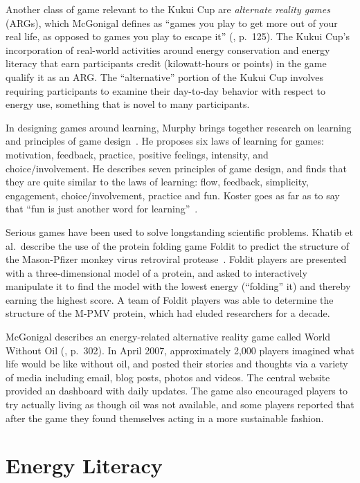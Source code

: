 Another class of game relevant to the Kukui Cup are \emph{alternate reality games} (ARGs), which McGonigal defines as ``games you play to get more out of your real life, as opposed to games you play to escape it'' (\cite{mcgonigal2011reality}, p.\ 125). The Kukui Cup's incorporation of real-world activities around energy conservation and energy literacy that earn participants credit (kilowatt-hours or points) in the game qualify it as an ARG. The ``alternative'' portion of the Kukui Cup involves requiring participants to examine their day-to-day behavior with respect to energy use, something that is novel to many participants.

In designing games around learning, Murphy brings together research on learning and principles of game design~\cite{Murphy2011}. He proposes six laws of learning for games: motivation, feedback, practice, positive feelings, intensity, and choice/involvement. He describes seven principles of game design, and finds that they are quite similar to the laws of learning: flow, feedback, simplicity, engagement, choice/involvement, practice and fun. Koster goes as far as to say that ``fun is just another word for learning''~\cite{Koster-theory-of-fun}.

Serious games have been used to solve longstanding scientific problems. Khatib et al.\ describe the use of the protein folding game Foldit to predict the structure of the Mason-Pfizer monkey virus retroviral protease~\cite{Khatib2011}. Foldit players are presented with a three-dimensional model of a protein, and asked to interactively manipulate it to find the model with the lowest energy (``folding'' it) and thereby earning the highest score. A team of Foldit players was able to determine the structure of the M-PMV protein, which had eluded researchers for a decade.

McGonigal describes an energy-related alternative reality game called World Without Oil (\cite{mcgonigal2011reality}, p.\ 302). In April 2007, approximately 2,000 players imagined what life would be like without oil, and posted their stories and thoughts via a variety of media including email, blog posts, photos and videos. The central website~\cite{worldwithoutoil} provided an dashboard with daily updates. The game also encouraged players to try actually living as though oil was not available, and some players reported that after the game they found themselves acting in a more sustainable fashion.


\section{Energy Literacy}
\label{sec:energy-literacy}


